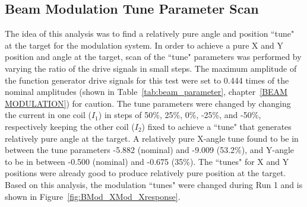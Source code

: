 %
%
%
%


\subsection{Beam Modulation Tune Parameter Scan}
\label{Beam Modulation Tune Parameter Scan}

The idea of this analysis was to find a relatively pure angle and position ``tune" at the target for the modulation system. In order to achieve a pure X and Y position and angle at the target, scan of the ``tune" parameters was performed by varying the ratio of the drive signals in small steps. The maximum amplitude of the function generator drive signals for this test were set to 0.444 times of the nominal amplitudes (shown in Table~\ref{tab:beam_parameter}, chapter~\ref{BEAM MODULATION}) for caution. The tune parameters were changed by changing the current in one coil ($I_{1}$) in steps of 50\%, 25\%, 0\%, -25\%, and -50\%, respectively keeping the other coil ($I_{2}$) fixed to achieve a ``tune" that generates relatively pure angle at the target. 
A relatively pure X-angle tune found to be in between the tune parameters -5.882 (nominal) and -9.009 (53.2\%), and Y-angle to be in between -0.500 (nominal) and -0.675 (35\%). The ``tunes" for X and Y positions were already good to produce relatively pure position at the target. Based on this analysis, the modulation ``tunes" were changed during Run 1 and is shown in Figure~\ref{fig:BMod_XMod_Xresponse}.


